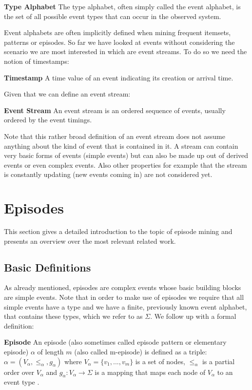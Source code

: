 \begin{mydef}
\textbf{Type Alphabet} The type alphabet, often simply called the event alphabet, is the set of all possible event types that can occur in the observed system.
\end{mydef}

Event alphabets are often implicitly defined when mining frequent itemsets, patterns or episodes.
So far we have looked at events without considering the scenario we are most interested in which are event streams. To do so we need the notion of timestamps:

\begin{mydef}
\textbf{Timestamp} A time value of an event indicating its creation or arrival time.
\end{mydef}

Given that we can define an event stream:

\begin{mydef}
\textbf{Event Stream} An event stream is an ordered sequence of events, usually ordered by the event timings.
\end{mydef}

Note that this rather broad definition of an event stream does not assume anything about the kind of event that is contained in it. A stream can contain very basic forms of events (simple events) but can also be made up out of derived events or even complex events. Also other properties for example that the stream is constantly updating (new events coming in) are not considered yet.


\section{Episodes}
\label{sec_episodes}
This section gives a detailed introduction to the topic of episode mining and presents an overview over the most relevant related work.

\subsection{Basic Definitions}

As already mentioned, episodes are complex events whose basic building blocks are simple events. Note that  in order to make use of episodes we require that all simple events have a type and we have a finite, previously known event alphabet, that contains these types, which we refer to as $\Sigma$. We follow up with a formal definition:

\begin{mydef}
\textbf{Episode} An episode (also sometimes called episode pattern or elementary episode) $\alpha$ of length $m$ (also called m-episode) is defined as a triple: $\alpha = (V_\alpha,{\leq}_{\alpha},g_\alpha)$ where $V_\alpha = \{v_1,...,v_m\}$ is a set of nodes, ${\leq}_{\alpha}$ is a partial order over $V_\alpha$ and $g_\alpha : V_\alpha \rightarrow \Sigma$ is a mapping that maps each node of $V_\alpha$ to an event type \cite{mannila1995discovering}.
\end{mydef}

